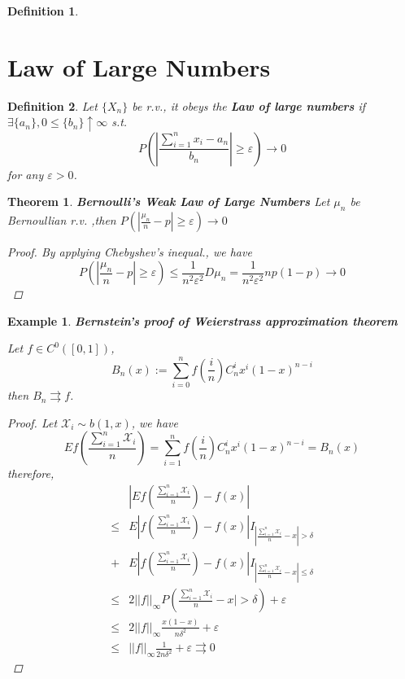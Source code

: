 \documentclass{article}
\newtheorem{definition}{Definition}
\newtheorem{theorem}{Theorem}
\newtheorem{example}{Example}
\begin{document}
\begin{CJK}{UTF8}{gbsn}
\begin{definition}
\end{definition}




\section{Law of Large Numbers}

\begin{definition}
	Let $\{X_n\}$ be r.v., it obeys the \textbf{Law of large numbers} if $\exists \{a_n\}, 0 \leq \{b_n\}\uparrow\infty$  s.t.
	$$P(|\frac{\sum_{i=1}^{n}x_i-a_n}{b_n}|\geq \varepsilon) \rightarrow 0$$
	for any $\varepsilon > 0$.
\end{definition}

\begin{theorem}
	\textbf{Bernoulli's Weak Law of Large Numbers}
	Let $\mu_n$ be Bernoullian r.v. ,then $P(|\frac{\mu_n}{n}-p| \geq \varepsilon)\rightarrow 0$
	\begin{proof}
		By applying Chebyshev's inequal., we have
		$$ P(|\frac{\mu_n}{n}-p| \geq \varepsilon) \leq \frac{1}{n^2\varepsilon^2}D\mu_n =\frac{1}{n^2\varepsilon^2}np(1-p) \rightarrow 0$$
	\end{proof}
\end{theorem}


\begin{example}
	\textbf{Bernstein's proof of Weierstrass approximation theorem}

		Let $f \in C^0([0,1])$,
	$$B_n(x):=\sum_{i=0}^{n}f(\frac{i}{n})C_n^ix^i(1-x)^{n-i}$$
	then $B_n \rightrightarrows f$.

	
	\begin{proof}
		Let $\mathcal{X}_i\sim b(1,x)$, we have
		$$Ef(\frac{\sum_{i=1}^n\mathcal{X}_i}{n})=\sum_{i=1}^nf(\frac{i}{n})C_n^ix^i(1-x)^{n-i}=B_n(x)$$
		therefore,
		\begin{align*}
			&|Ef(\frac{\sum_{i=1}^n\mathcal{X}_i}{n})-f(x)| \\
			\leq &E|f(\frac{\sum_{i=1}^n\mathcal{X}_i}{n})-f(x)|I_{|\frac{\sum_{i=1}^n\mathcal{X}_i}{n}-x|>\delta} \\
			+& E|f(\frac{\sum_{i=1}^n\mathcal{X}_i}{n})-f(x)|I_{|\frac{\sum_{i=1}^n\mathcal{X}_i}{n}-x|\leq \delta} \\
			\leq& 2||f||_{\infty}P(\frac{\sum_{i=1}^n\mathcal{X}_i}{n}-x|>\delta)+\varepsilon \\
			\leq & 2||f||_{\infty}\frac{x(1-x)}{n\delta^2}+\varepsilon \\
			\leq & ||f||_\infty\frac{1}{2n\delta^2}+\varepsilon \rightrightarrows 0
		\end{align*}
	\end{proof}
\end{example}








\end{CJK}
\end{document}
